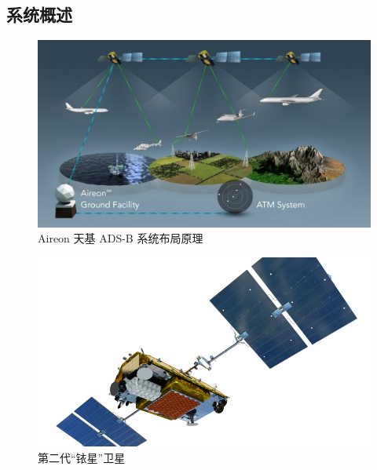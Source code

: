 \subsection{系统概述}



\begin{figure}[htbp]
\centering
\includegraphics[width=15cm]{pic/Aireon_GlobalSpaceBasedADSB_Coverage_Diagram-1024x576.jpg}
\caption{Aireon 天基 ADS-B 系统布局原理}
\label{fig:Aireon_GlobalSpaceBasedADSB_Coverage_Diagram}
\end{figure}

\begin{figure}[htbp]
\centering
\includegraphics[width=13cm]{pic/IMG_Iridium-Satellite_NEXT-Satellite-Vehicle_HR_FEB16-clip-833x474.png}
\caption{第二代“铱星”卫星}
\label{fig:IMG_Iridium-Satellite_NEXT-Satellite-Vehicle}
\end{figure}

